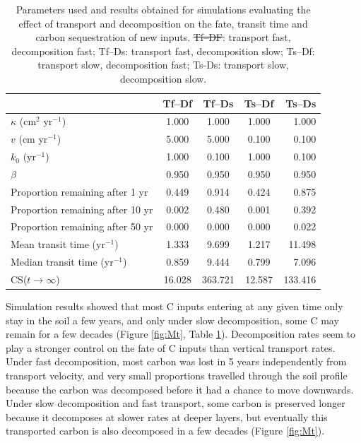 \documentclass[11pt, oneside, a4paper]{article}   	%
\providecommand{\DIFaddtex}[1]{{\protect\color{blue}\uwave{#1}}} %
\providecommand{\DIFdeltex}[1]{{\protect\color{red}\sout{#1}}}                      %
\providecommand{\DIFaddFL}[1]{\DIFadd{#1}} %
\providecommand{\DIFdelFL}[1]{\DIFdel{#1}} %
\providecommand{\DIFaddbeginFL}{} %
\providecommand{\DIFaddendFL}{} %
\providecommand{\DIFdelbeginFL}{} %
\providecommand{\DIFdelendFL}{} %
\providecommand{\DIFadd}[1]{\texorpdfstring{\DIFaddtex{#1}}{#1}} %
\providecommand{\DIFdel}[1]{\texorpdfstring{\DIFdeltex{#1}}{}} %
\newcommand{\DIFscaledelfig}{0.5}
\newlength{\DIFdelgraphicswidth} %
\newlength{\DIFdelgraphicsheight} %
\newcommand{\DIFaddincludegraphics}[2][]{{\color{blue}\fbox{\DIFOincludegraphics[#1]{#2}}}} %
\newcommand{\DIFdelincludegraphics}[2][]{%
\sbox{\DIFdelgraphicsbox}{\DIFOincludegraphics[#1]{#2}}%
\settoboxwidth{\DIFdelgraphicswidth}{\DIFdelgraphicsbox} %
\settoboxtotalheight{\DIFdelgraphicsheight}{\DIFdelgraphicsbox} %
\scalebox{\DIFscaledelfig}{%
\parbox[b]{\DIFdelgraphicswidth}{\usebox{\DIFdelgraphicsbox}\\[-\baselineskip] \rule{\DIFdelgraphicswidth}{0em}}\llap{\resizebox{\DIFdelgraphicswidth}{\DIFdelgraphicsheight}{%
\setlength{\unitlength}{\DIFdelgraphicswidth}%
\begin{picture}(1,1)%
\thicklines\linethickness{2pt} %
{\color[rgb]{1,0,0}\put(0,0){\framebox(1,1){}}}%
{\color[rgb]{1,0,0}\put(0,0){\line( 1,1){1}}}%
{\color[rgb]{1,0,0}\put(0,1){\line(1,-1){1}}}%
\end{picture}%
}\hspace*{3pt}}} %
} %
\DeclareRobustCommand{\DIFaddbeginFL}{\DIFOaddbeginFL \let\includegraphics\DIFaddincludegraphics} %
\DeclareRobustCommand{\DIFaddendFL}{\DIFOaddendFL \let\includegraphics\DIFOincludegraphics} %
\DeclareRobustCommand{\DIFdelbeginFL}{\DIFOdelbeginFL \let\includegraphics\DIFdelincludegraphics} %
\DeclareRobustCommand{\DIFdelendFL}{\DIFOaddendFL \let\includegraphics\DIFOincludegraphics} %
\begin{document}
\begin{table}[h]
   \centering
   \caption{Parameters used and results obtained for simulations evaluating the effect of transport and decomposition on the fate, transit time and carbon sequestration of new inputs. \DIFdelbeginFL \DIFdelFL{Tf--DF}\DIFdelendFL \DIFaddbeginFL \DIFaddFL{Tf--Df}\DIFaddendFL : transport fast, decomposition fast; Tf--Ds: transport fast, decomposition slow; Ts--Df: transport slow, decomposition fast; Ts-Ds: transport slow, decomposition slow.}
   \begin{tabular}{@{} lcccr @{}} %
\toprule
 & Tf--Df & Tf--Ds & Ts--Df & Ts--Ds\\
\midrule
$\kappa$ (cm$^2$ yr$^{-1}$) & 1.000 & 1.000 & 1.000 & 1.000\\
$v$ (cm yr$^{-1}$) & 5.000 & 5.000 & 0.100 & 0.100\\
$k_0$ (yr$^{-1}$) & 1.000 & 0.100 & 1.000 & 0.100\\
$\beta$ & 0.950 & 0.950 & 0.950 & 0.950\\
Proportion remaining after 1 yr & 0.449   & 0.914 & 0.424  & 0.875\\
Proportion remaining after 10 yr & 0.002  & 0.480 & 0.001 &  0.392 \\
Proportion remaining after 50 yr & 0.000  & 0.000 & 0.000  & 0.022 \\
Mean transit time (yr$^{-1}$) & 1.333  & 9.699 & 1.217 & 11.498 \\
Median transit time (yr$^{-1}$) & 0.859  & 9.444 & 0.799  & 7.096 \\
CS($t \to \infty$) & 16.028 & 363.721 &12.587 &133.416 \\
\bottomrule
\end{tabular}
   \label{tab:simulationSetup}
\end{table}

Simulation results showed that most C inputs entering at any given time only stay in the soil a few years, and only under slow decomposition, some C may remain for a few decades (Figure \ref{fig:Mt}, Table \ref{tab:simulationSetup}). Decomposition rates seem to play a stronger control on the fate of C inputs than vertical transport rates. Under fast decomposition, most carbon was lost in 5 years independently from transport velocity, and very small proportions travelled through the soil profile because the carbon was decomposed before it had a chance to move downwards. Under slow decomposition and fast transport, some carbon is preserved longer because it decomposes at slower rates at deeper layers, but eventually this transported carbon is also decomposed in a few decades (Figure \ref{fig:Mt}).
\end{document}
